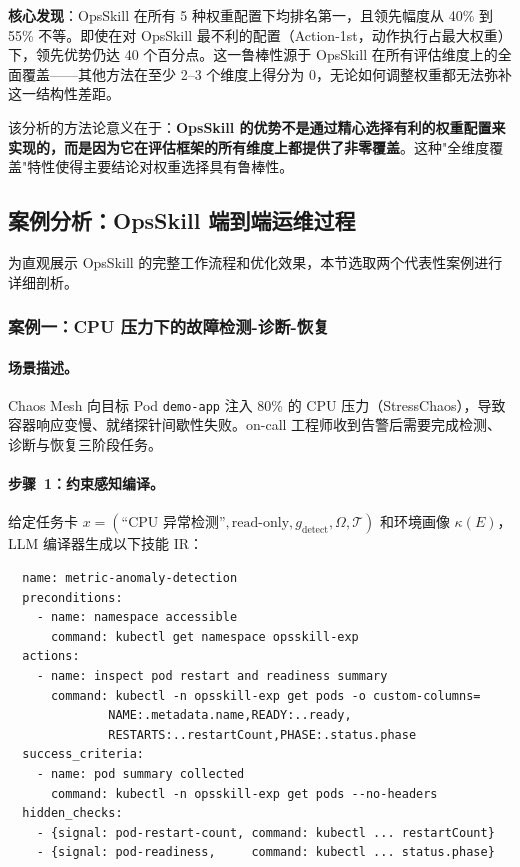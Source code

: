 \documentclass[11pt,a4paper]{ctexart}
\begin{document}
\textbf{核心发现}：OpsSkill 在所有 5 种权重配置下均排名第一，且领先幅度从 40\% 到 55\% 不等。即使在对 OpsSkill 最不利的配置（Action-1st，动作执行占最大权重）下，领先优势仍达 40 个百分点。这一鲁棒性源于 OpsSkill 在所有评估维度上的全面覆盖——其他方法在至少 2--3 个维度上得分为 0，无论如何调整权重都无法弥补这一结构性差距。

该分析的方法论意义在于：\textbf{OpsSkill 的优势不是通过精心选择有利的权重配置来实现的，而是因为它在评估框架的所有维度上都提供了非零覆盖}。这种"全维度覆盖"特性使得主要结论对权重选择具有鲁棒性。


\subsection{案例分析：OpsSkill 端到端运维过程}

为直观展示 OpsSkill 的完整工作流程和优化效果，本节选取两个代表性案例进行详细剖析。

\subsubsection{案例一：CPU 压力下的故障检测-诊断-恢复}

\paragraph{场景描述。}Chaos Mesh 向目标 Pod \texttt{demo-app} 注入 80\% 的 CPU 压力（StressChaos），导致容器响应变慢、就绪探针间歇性失败。on-call 工程师收到告警后需要完成检测、诊断与恢复三阶段任务。

\paragraph{步骤~1：约束感知编译。}给定任务卡 $x=(\text{``CPU 异常检测''}, \text{read-only}, g_{\text{detect}}, \Omega, \mathcal{T})$ 和环境画像 $\kappa(E)$，LLM 编译器生成以下技能 IR：

\begin{small}
\begin{verbatim}
  name: metric-anomaly-detection
  preconditions:
    - name: namespace accessible
      command: kubectl get namespace opsskill-exp
  actions:
    - name: inspect pod restart and readiness summary
      command: kubectl -n opsskill-exp get pods -o custom-columns=
              NAME:.metadata.name,READY:..ready,
              RESTARTS:..restartCount,PHASE:.status.phase
  success_criteria:
    - name: pod summary collected
      command: kubectl -n opsskill-exp get pods --no-headers
  hidden_checks:
    - {signal: pod-restart-count, command: kubectl ... restartCount}
    - {signal: pod-readiness,     command: kubectl ... status.phase}
\end{verbatim}
\end{small}
\end{document}
